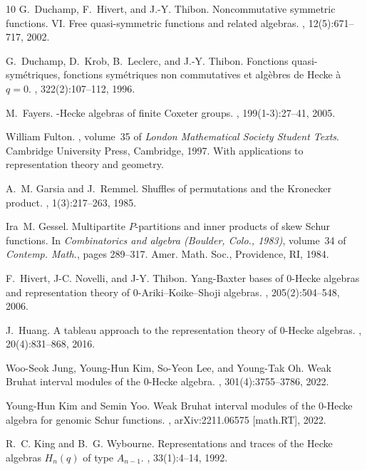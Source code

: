 \documentclass[12pt, reqno]{amsart}
\theoremstyle{definition}
\numberwithin{equation}{section} \numberwithin{figure}{section}
\numberwithin{table}{section}
\begin{document}
\begin{thebibliography}{10}
G.~Duchamp, F.~Hivert, and J.-Y. Thibon.
\newblock Noncommutative symmetric functions. {VI}. {F}ree quasi-symmetric
  functions and related algebras.
, 12(5):671--717, 2002.

G.~Duchamp, D.~Krob, B.~Leclerc, and J.-Y. Thibon.
\newblock Fonctions quasi-sym\'{e}triques, fonctions sym\'{e}triques non
  commutatives et alg\`ebres de {H}ecke \`a {$q=0$}.
, 322(2):107--112, 1996.

M.~Fayers.
-{H}ecke algebras of finite {C}oxeter groups.
, 199(1-3):27--41, 2005.

William Fulton.
, volume~35 of {\em London Mathematical Society
  Student Texts}.
\newblock Cambridge University Press, Cambridge, 1997.
\newblock With applications to representation theory and geometry.

A.~M. Garsia and J.~Remmel.
\newblock Shuffles of permutations and the {K}ronecker product.
, 1(3):217--263, 1985.

Ira~M. Gessel.
\newblock Multipartite {$P$}-partitions and inner products of skew {S}chur
  functions.
\newblock In {\em Combinatorics and algebra ({B}oulder, {C}olo., 1983)},
  volume~34 of {\em Contemp. Math.}, pages 289--317. Amer. Math. Soc.,
  Providence, RI, 1984.

F.~Hivert, J-C. Novelli, and J-Y. Thibon.
\newblock Yang-{B}axter bases of {$0$}-{H}ecke algebras and representation
  theory of {$0$}-{A}riki--{K}oike--{S}hoji algebras.
, 205(2):504--548, 2006.

J.~Huang.
\newblock A tableau approach to the representation theory of {$0$}-{H}ecke
  algebras.
, 20(4):831--868, 2016.

Woo-Seok Jung, Young-Hun Kim, So-Yeon Lee, and Young-Tak Oh.
\newblock Weak {B}ruhat interval modules of the 0-{H}ecke algebra.
, 301(4):3755--3786, 2022.

Young-Hun Kim and Semin Yoo.
\newblock Weak {B}ruhat interval modules of the $0$-{H}ecke algebra for genomic
  {S}chur functions.
, arXiv:2211.06575 [math.RT], 2022.

R.~C. King and B.~G. Wybourne.
\newblock Representations and traces of the {H}ecke algebras {$H_n(q)$} of type
  {$A_{n-1}$}.
, 33(1):4--14, 1992.


\end{thebibliography}
\end{document}
